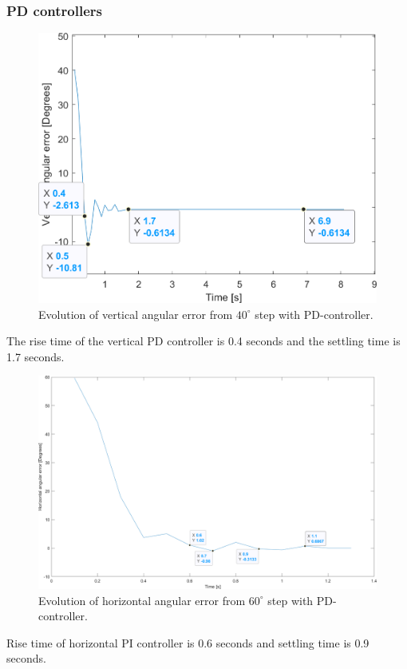 \subsubsection{PD controllers}
\label{sec:simon14}
\begin{figure}[h]
\centering
\includegraphics[width=\linewidth]{sections/assets/Vertical_PD_controller.png}
\caption{Evolution of vertical angular error from \(40^{\circ}\) step with PD-controller.}
\label{vert_PD}
\end{figure}
The rise time of the vertical PD controller is 0.4 seconds and the settling time is 1.7 seconds.
\begin{figure}[h]
\centering
\includegraphics[width=\linewidth]{sections/assets/Horizontal_PD_controller.png}
\caption{Evolution of horizontal angular error from \(60^{\circ}\) step with PD-controller.}
\label{Horizontal_PD}
\end{figure}
Rise time of horizontal PI controller is 0.6 seconds and settling time is 0.9 seconds.

